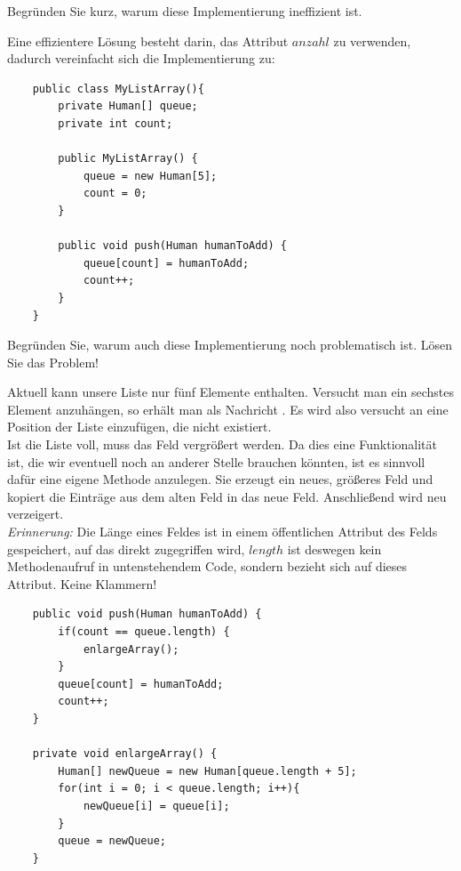 \documentclass{article}
\begin{document}
\begin{task}{1}
Begründen Sie kurz, warum diese Implementierung ineffizient ist. 
\end{task}
\vspace{2cm}
Eine effizientere Lösung besteht darin, das Attribut $anzahl$ zu verwenden, dadurch vereinfacht sich die Implementierung zu: 

\begin{verbatim}
    public class MyListArray(){
        private Human[] queue;
        private int count; 

        public MyListArray() {
            queue = new Human[5];
            count = 0;
        }

        public void push(Human humanToAdd) {
            queue[count] = humanToAdd;
            count++;
        }
    }
\end{verbatim}

\begin{task}{2}
Begründen Sie, warum auch diese Implementierung noch problematisch ist. Lösen Sie das Problem!
\end{task}

\vspace{2cm}

Aktuell kann unsere Liste nur fünf Elemente enthalten. Versucht man ein sechstes Element anzuhängen, so erhält man
als Nachricht \textbf{}. Es wird also versucht an eine Position der Liste einzufügen, die nicht existiert.\\
Ist die Liste voll, muss das Feld vergrößert werden. Da dies eine Funktionalität ist, die wir eventuell noch an anderer Stelle brauchen könnten, ist es sinnvoll dafür eine eigene Methode anzulegen. Sie erzeugt ein neues, größeres Feld und kopiert die Einträge aus dem alten Feld in das neue Feld. Anschließend wird neu verzeigert.\\
\textit{Erinnerung:} Die Länge eines Feldes ist in einem öffentlichen Attribut des Felds gespeichert, auf das direkt zugegriffen wird, $length$ ist deswegen kein Methodenaufruf in untenstehendem Code, sondern bezieht sich auf dieses Attribut. Keine Klammern!
\begin{verbatim}
    public void push(Human humanToAdd) {
        if(count == queue.length) {
            enlargeArray();
        } 
        queue[count] = humanToAdd;
        count++;
    }

    private void enlargeArray() {
        Human[] newQueue = new Human[queue.length + 5];
        for(int i = 0; i < queue.length; i++){
            newQueue[i] = queue[i];
        }
        queue = newQueue;
    }
\end{verbatim}
\end{document}
